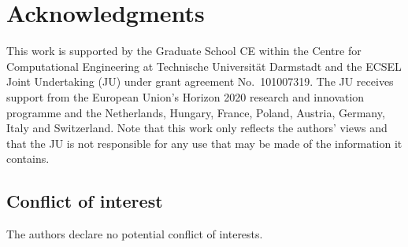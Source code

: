 \documentclass[AMA,STIX1COL]{WileyNJD-v2}
\begin{document}

\section*{Acknowledgments}
This work is supported by the Graduate School CE within the Centre for Computational Engineering at Technische Universit{\"a}t Darmstadt and the ECSEL Joint Undertaking (JU) under grant agreement No.~101007319. The JU receives support from the European Union's Horizon 2020 research and innovation programme and the Netherlands, Hungary, France, Poland, Austria, Germany, Italy and Switzerland. Note that this work only reflects the authors' views and that the JU is not responsible for any use that may be made of the information it contains.



\subsection*{Conflict of interest}
The authors declare no potential conflict of interests.


\appendix
\end{document}
